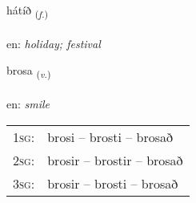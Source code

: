 \documentclass[frontgrid, backgrid]{flacards}\usepackage[]{graphicx}\usepackage[]{color}
\begin{document}
\renewcommand{\flhead}{\vskip5pt \fboxsep=0pt {\small\bfseries\footnotesize Nafnorð | Noun}}
\renewcommand{\fcfoot}{\vskip5pt \fboxsep=0pt \hspace{2pt}{\small\bfseries\footnotesize 2K}}

\renewcommand{\blhead}{\vskip5pt {\small\bfseries\footnotesize Nafnorð | Noun }}
\renewcommand{\bcfoot}{\vskip5pt \hspace{2pt}{\small\bfseries\footnotesize 2K}}


{hátíð \small{\textsubscript{(\textit{f.})}} \\[1ex] %
\textphonetic{[hauːtʰið]} \\
en: \emph{holiday; festival} \\  [2ex]
\renewcommand*{\arraystretch}{0.8}
}

\renewcommand{\flhead}{\vskip5pt \fboxsep=0pt {\small\bfseries\footnotesize Sagnorð | Verb}}
\renewcommand{\fcfoot}{\vskip5pt \fboxsep=0pt \hspace{2pt}{\small\bfseries\footnotesize 2K}}

\renewcommand{\blhead}{\vskip5pt {\small\bfseries\footnotesize Sagnorð | Verb }}
\renewcommand{\bcfoot}{\vskip5pt \hspace{2pt}{\small\bfseries\footnotesize 2K}}


{brosa \small{\textsubscript{(\textit{v.})}} \\[1ex] %
\textphonetic{[prɔːsa]} \\
en: \emph{smile} \\  [2ex]
\renewcommand*{\arraystretch}{0.8}
\begin{tabular}{p{1cm}l}
\textsc{1sg}: & brosi -- brosti -- brosað \\ 
\textsc{2sg}: & brosir -- brostir -- brosað \\ 
\textsc{3sg}: & brosir -- brosti -- brosað \\ 
\end{tabular}
}
\end{document}
